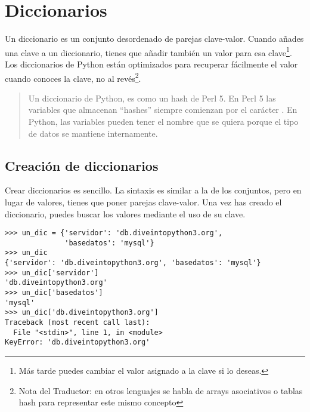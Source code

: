 \section{Diccionarios}

Un diccionario es un conjunto desordenado de parejas clave-valor. Cuando añades una clave a un diccionario, tienes que añadir también un valor para esa clave\footnote{Más tarde puedes cambiar el valor asignado a la clave si lo deseas.}. Los diccionarios de Python están optimizados para recuperar fácilmente el valor cuando conoces la clave, no al revés\footnote{Nota del Traductor: en otros lenguajes se habla de arrays asociativos o tablas hash para representar este mismo concepto}.

\begin{quote}
Un diccionario de Python, es como un hash de Perl 5. En Perl 5 las variables que almacenan ``hashes'' siempre comienzan por el carácter \codigo{\%}. En Python, las variables pueden tener el nombre que se quiera porque el tipo de datos se mantiene internamente.

\end{quote}

\subsection{Creación de diccionarios}

Crear diccionarios es sencillo. La sintaxis es similar a la de los conjuntos, pero en lugar de valores, tienes que poner parejas clave-valor. Una vez has creado el diccionario, puedes buscar los valores mediante el uso de su clave.

\noindent\begin{minipage}{\textwidth}
\begin{lstlisting}[mathescape=True]
>>> un_dic = {'servidor': 'db.diveintopython3.org',
              'basedatos': 'mysql'}
>>> un_dic
{'servidor': 'db.diveintopython3.org', 'basedatos': 'mysql'}
>>> un_dic['servidor']
'db.diveintopython3.org'
>>> un_dic['basedatos']
'mysql'
>>> un_dic['db.diveintopython3.org']
Traceback (most recent call last):
  File "<stdin>", line 1, in <module>
KeyError: 'db.diveintopython3.org'
\end{lstlisting}
\end{minipage}

